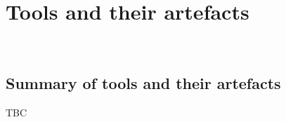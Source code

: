 \chapter{Tools and their artefacts}~\label{chapter-apps-and-their-artefacts}

\section{Summary of tools and their artefacts}
TBC